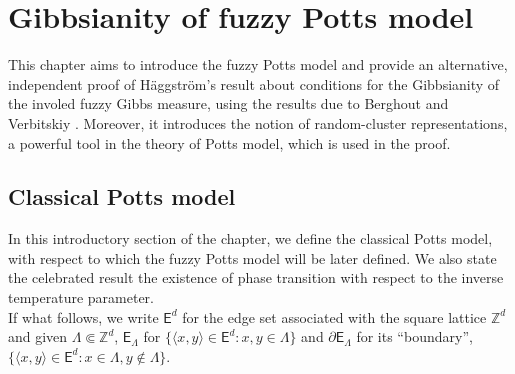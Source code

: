 \documentclass[12pt]{article}
\newcommand{\E}{\mathsf{E}}
\newcommand{\Z}{\mathbb{Z}}
\newcommand{\1}{\mathbbm{1}}
\renewcommand{\sp}[1]{\langle #1\rangle}
\newcommand{\5}{\vspace{0.5cm}}
\theoremstyle{definition}
\begin{document}
\pagebreak


\section{Gibbsianity of fuzzy Potts model}\label{ch:3}

This chapter aims to introduce the fuzzy Potts model and provide an alternative, independent proof of H\"aggstr\"om's result \cite{Hag} about conditions for the Gibbsianity of the involed fuzzy Gibbs measure, using the results due to Berghout and Verbitskiy \cite{Ber}. Moreover, it introduces the notion of random-cluster representations, a powerful tool in the theory of Potts model, which is used in the proof.


\subsection{Classical Potts model}

In this introductory section of the chapter, we define the classical Potts model, with respect to which the fuzzy Potts model will be later defined. We also state the celebrated result the existence of phase transition with respect to the inverse temperature parameter. \\

If what follows, we write $\E^d$ for the edge set associated with the square lattice $\Z^d$ and given $\Lambda\Subset\Z^d$, $\E_\Lambda$ for $\{\sp{x,y}\in\E^d:x,y\in\Lambda\}$ and $\partial\E_\Lambda$ for its ``boundary'', $\{\sp{x,y}\in\E^d:x\in\Lambda,y\notin\Lambda\}$. \\
\end{document}
